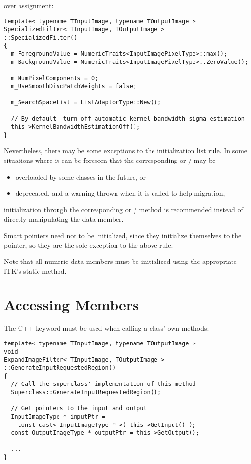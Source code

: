 over assignment:

\small
\begin{verbatim}
template< typename TInputImage, typename TOutputImage >
SpecializedFilter< TInputImage, TOutputImage >
::SpecializedFilter()
{
  m_ForegroundValue = NumericTraits<InputImagePixelType>::max();
  m_BackgroundValue = NumericTraits<InputImagePixelType>::ZeroValue();

  m_NumPixelComponents = 0;
  m_UseSmoothDiscPatchWeights = false;

  m_SearchSpaceList = ListAdaptorType::New();

  // By default, turn off automatic kernel bandwidth sigma estimation
  this->KernelBandwidthEstimationOff();
}
\end{verbatim}
\normalsize

Nevertheless, there may be some exceptions to the initialization list rule. In
some situations where it can be foreseen that the corresponding
 or / may be

\begin{itemize}
\item overloaded by some classes in the future, or
\item deprecated, and a warning thrown when it is called to help migration,
\end{itemize}

initialization through the corresponding  or
/ method is recommended instead of directly
manipulating the data member.

Smart pointers need not to be initialized, since they initialize themselves
to the  pointer, so they are the sole exception to the above rule.

Note that all numeric data members must be initialized using the appropriate
ITK's  static method.


\section{Accessing Members}
\label{sec:Accessing Members}

The C++ keyword  must be used when calling a class' own methods:

\small
\begin{verbatim}
template< typename TInputImage, typename TOutputImage >
void
ExpandImageFilter< TInputImage, TOutputImage >
::GenerateInputRequestedRegion()
{
  // Call the superclass' implementation of this method
  Superclass::GenerateInputRequestedRegion();

  // Get pointers to the input and output
  InputImageType * inputPtr =
    const_cast< InputImageType * >( this->GetInput() );
  const OutputImageType * outputPtr = this->GetOutput();

  ...
}
\end{verbatim}
\normalsize

